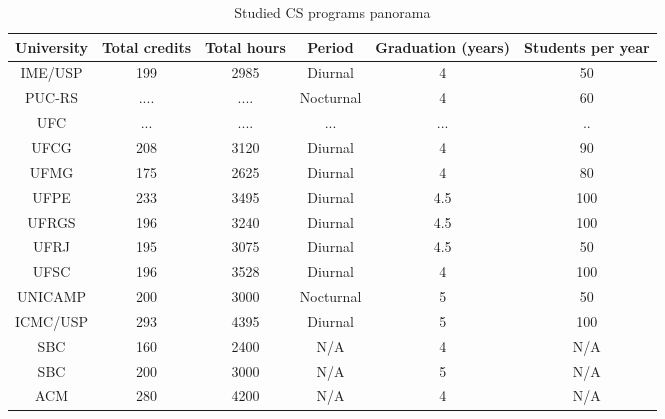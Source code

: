 \documentclass[conference]{IEEEtran}
\begin{document}
\begin{table*}
	\centering
	\caption{Studied CS programs panorama}
    \begin{tabular}{|c|c|c|c|c|c|}
        \hline
        University         & Total credits  & Total hours & Period           & Graduation (years) & Students per year \\ \hline
        IME/USP \cite{ime} & 199            & 2985        & Diurnal           & 4               & 50                   \\ 
        PUC-RS \cite{pucrs}& ....           & ....        & Nocturnal           & 4               & 60                   \\ 
        UFC \cite{ufc}     & ...            & ....        & ... & ...               & ..                   \\ 
        UFCG \cite{ufcg}   & 208            & 3120        & Diurnal           & 4               & 90                   \\ 
        UFMG \cite{ufmg}   & 175            & 2625        & Diurnal           & 4               & 80                   \\ 
        UFPE \cite{ufpe}   & 233            & 3495        & Diurnal           & 4.5             & 100                  \\ 
        UFRGS \cite{ufrgs} & 196            & 3240        & Diurnal           & 4.5             & 100                  \\ 
        UFRJ \cite{ufrj}   & 195            & 3075        & Diurnal           & 4.5             & 50                   \\ 
        UFSC \cite{ufsc}   & 196            & 3528        & Diurnal           & 4               & 100                  \\ 
        UNICAMP \cite{unicamp}& 200         & 3000        & Nocturnal          & 5               & 50                   \\ 
        ICMC/USP \cite{icmc}& 293           & 4395        & Diurnal           & 5               & 100                  \\ 
        SBC \cite{sbc}     & 160            & 2400        & N/A              & 4               & N/A                  \\ 
        SBC \cite{sbc}     & 200            & 3000        & N/A              & 5               & N/A                  \\ 
        ACM \cite{cs2008}  & 280            & 4200        & N/A              & 4               & N/A                  \\
        \hline
    \end{tabular}
\end{table*}
\end{document}

